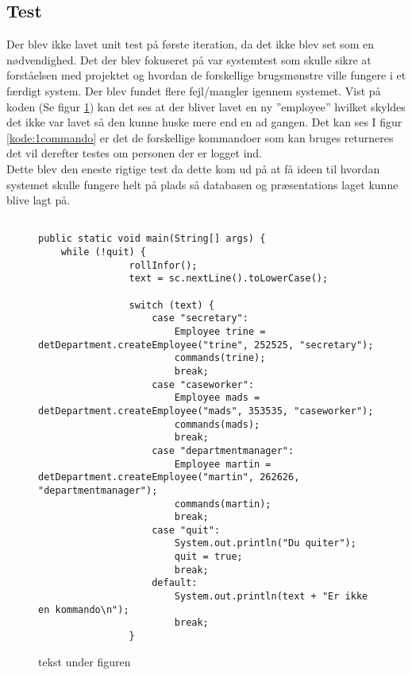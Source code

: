 \subsection{Test}
Der blev ikke lavet unit test på første iteration, da det ikke blev set som en nødvendighed. Det der blev fokuseret på var systemtest som skulle sikre at forståelsen med projektet og hvordan de forskellige brugsmønstre ville fungere i et færdigt system. Der blev fundet flere fejl/mangler igennem systemet. Vist på koden (Se figur \ref{kode:1main}) kan det ses at der bliver lavet en ny ”employee” hvilket skyldes det ikke var lavet så den kunne huske mere end en ad gangen. Det kan ses I figur \ref{kode:1commando} er det de forskellige kommandoer som kan bruges returneres det vil derefter testes om personen der er logget ind. \\
Dette blev den eneste rigtige test da dette kom ud på at få ideen til hvordan systemet skulle fungere helt på plads så databasen og præsentations laget kunne blive lagt på. 
\begin{figure}[hbt!]
\begin{lstlisting}

public static void main(String[] args) {
	while (!quit) {
                rollInfor();
                text = sc.nextLine().toLowerCase();

                switch (text) {
                    case "secretary":
                        Employee trine = detDepartment.createEmployee("trine", 252525, "secretary");
                        commands(trine);
                        break;
                    case "caseworker":
                        Employee mads = detDepartment.createEmployee("mads", 353535, "caseworker");
                        commands(mads);
                        break;
                    case "departmentmanager":
                        Employee martin = detDepartment.createEmployee("martin", 262626, "departmentmanager");
                        commands(martin);
                        break;
                    case "quit":
                        System.out.println("Du quiter");
                        quit = true;
                        break;
                    default:
                        System.out.println(text + "Er ikke en kommando\n");
                        break;
                }
\end{lstlisting}
\caption{tekst under figuren}
\label{kode:1main}
\end{figure}
